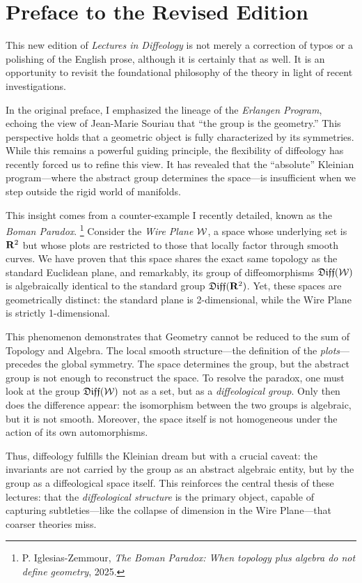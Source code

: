 \chapter*{Preface to the Revised Edition}

\vspace{-1em}
This new edition of \emph{Lectures in Diffeology} is not merely a correction of typos or a polishing of the English prose,
although it is certainly that as well.
It is an opportunity to revisit the foundational philosophy of the theory in light of recent investigations.

In the original preface,
I emphasized the lineage of the \emph{Erlangen Program},
echoing the view of Jean-Marie Souriau that ``the group is the geometry.''
This perspective holds that a geometric object is fully characterized by its symmetries.
While this remains a powerful guiding principle,
the flexibility of diffeology has recently forced us to refine this view.
It has revealed that the ``absolute'' Kleinian program—where the abstract group determines the space—is insufficient when we step outside the rigid world of manifolds.

This insight comes from a counter-example I recently detailed,
known as the \emph{Boman Paradox}.%
\footnote{P. Iglesias-Zemmour, \emph{The Boman Paradox: When topology plus algebra do not define geometry}, 2025.}
Consider the \emph{Wire Plane} $\mathcal{W}$,
a space whose underlying set is $\mathbf{R}^2$ but whose plots are restricted to those that locally factor through smooth curves.
We have proven that this space shares the exact same topology as the standard Euclidean plane,
and remarkably,
its group of diffeomorphisms $\mathfrak{Diff}(\mathcal{W})$ is algebraically identical to the standard group $\mathfrak{Diff}(\mathbf{R}^2)$.
Yet,
these spaces are geometrically distinct:
the standard plane is 2-dimensional,
while the Wire Plane is strictly 1-dimensional.

This phenomenon demonstrates that Geometry cannot be reduced to the sum of Topology and Algebra.
The local smooth structure—the definition of the \emph{plots}—precedes the global symmetry.
The space determines the group,
but the abstract group is not enough to reconstruct the space.
To resolve the paradox,
one must look at the group $\mathfrak{Diff}(\mathcal{W})$ not as a set,
but as a \emph{diffeological group}.
Only then does the difference appear:
the isomorphism between the two groups is algebraic,
but it is not smooth.
Moreover,
the space itself is not homogeneous under the action of its own automorphisms.

Thus,
diffeology fulfills the Kleinian dream but with a crucial caveat:
the invariants are not carried by the group as an abstract algebraic entity,
but by the group as a diffeological space itself.
This reinforces the central thesis of these lectures:
that the \emph{diffeological structure} is the primary object,
capable of capturing subtleties—like the collapse of dimension in the Wire Plane—that coarser theories miss.

